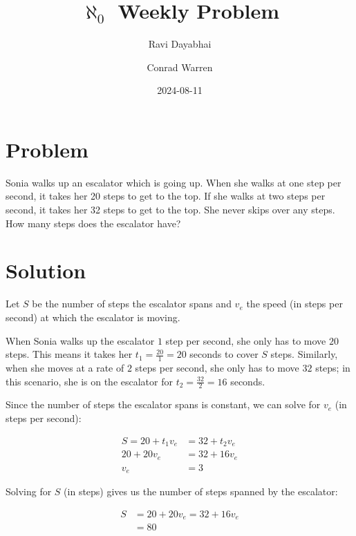 \documentclass{article}
\title{$\aleph_{0}$ Weekly Problem}
\author{Ravi Dayabhai \and Conrad Warren}
\date{2024-08-11}
\begin{document}
\maketitle

\section*{Problem}

Sonia walks up an escalator which is going up. When she walks at one step per second, it takes her 20 steps to get to the top. If she walks at two steps per second, it takes her 32 steps to get to the top. She never skips over any steps. How many steps does the escalator have?

\section*{Solution}

Let $S$ be the number of steps the escalator spans and $v_{e}$ the speed (in steps per second) at which the escalator is moving. 

When Sonia walks up the escalator $1$ step per second, she only has to move $20$ steps. This means it takes her $t_{1} = \frac{20}{1} = 20$ seconds to cover $S$ steps. Similarly, when she moves at a rate of $2$ steps per second, she only has to move $32$ steps; in this scenario, she is on the escalator for $t_2 = \frac{32}{2} = 16$ seconds.


Since the number of steps the escalator spans is constant, we can solve for $v_{e}$ (in steps per second):

\begin{align*}
    S = 20 + t_{1}v_{e} &= 32 + t_{2}v_{e}\\
    20 + 20v_{e} &= 32 + 16v_{e}\\
    v_{e} &= 3
\end{align*}

Solving for $S$ (in steps) gives us the number of steps spanned by the escalator:

\begin{align*}
    S &= 20 + 20v_{e} = 32 + 16v_{e}\\
      &= \boxed{80}
\end{align*}
\end{document}
